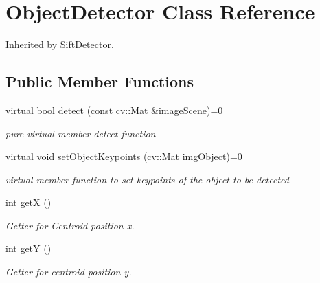 \hypertarget{class_object_detector}{}\section{Object\+Detector Class Reference}
\label{class_object_detector}


Inherited by \hyperlink{class_sift_detector}{Sift\+Detector}.

\subsection*{Public Member Functions}
\begin{DoxyCompactItemize}
\item 
virtual bool \hyperlink{class_object_detector_a113a9a3336d0764c1afe5166264135c0}{detect} (const cv\+::\+Mat \&image\+Scene)=0
\begin{DoxyCompactList}\small\item\em pure virtual member detect function \end{DoxyCompactList}\item 
virtual void \hyperlink{class_object_detector_a0d91abdee4036427163e2fb9c1018cd8}{set\+Object\+Keypoints} (cv\+::\+Mat \hyperlink{class_object_detector_a61777cf5e76f8ba8e2d605b63c7bb2b3}{img\+Object})=0
\begin{DoxyCompactList}\small\item\em virtual member function to set keypoints of the object to be detected \end{DoxyCompactList}\item 
int \hyperlink{class_object_detector_afa238f454f2ac69786d97868ebba218b}{getX} ()
\begin{DoxyCompactList}\small\item\em Getter for Centroid position x. \end{DoxyCompactList}\item 
int \hyperlink{class_object_detector_a92fd9162171858c735136118b4bb91fe}{getY} ()
\begin{DoxyCompactList}\small\item\em Getter for centroid position y. \end{DoxyCompactList}\end{DoxyCompactItemize}
